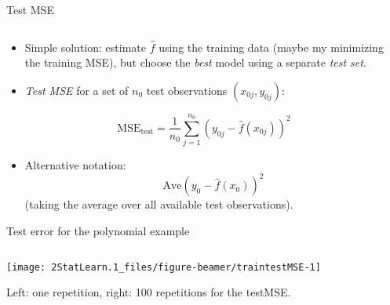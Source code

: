 \documentclass[ignorenonframetext,]{beamer}
\providecommand{\tightlist}{%
  \setlength{\itemsep}{0pt}\setlength{\parskip}{0pt}}
\begin{document}
\begin{frame}

\begin{block}{Test MSE}

\(~\)

\begin{itemize}
\tightlist
\item
  Simple solution: estimate \(\hat{f}\) using the training data (maybe
  my minimizing the training MSE), but choose the \emph{best} model
  using a separate \emph{test set}.
\end{itemize}

\vspace{2mm}

\begin{itemize}
\tightlist
\item
  \emph{Test MSE} for a set of \(n_0\) test observations
  \((x_{0j},y_{0j})\):
\end{itemize}

\[ \text{MSE}_{\text{test}}=\frac{1}{n_0}\sum_{j=1}^{n_0} (y_{0j}-\hat{f}(x_{0j}))^2\]

\vspace{2mm}

\begin{itemize}
\tightlist
\item
  Alternative notation: \[\text{Ave}(y_0-\hat{f}(x_0))^2\] (taking the
  average over all available test observations).
\end{itemize}

\end{block}

\end{frame}

\begin{frame}

\begin{block}{Test error for the polynomial example}

\(~\)

\begin{center}\texttt{[image: 2StatLearn.1\_files/figure-beamer/traintestMSE-1]} \end{center}

Left: one repetition, right: 100 repetitions for the testMSE.

\end{block}

\end{frame}
\end{document}
